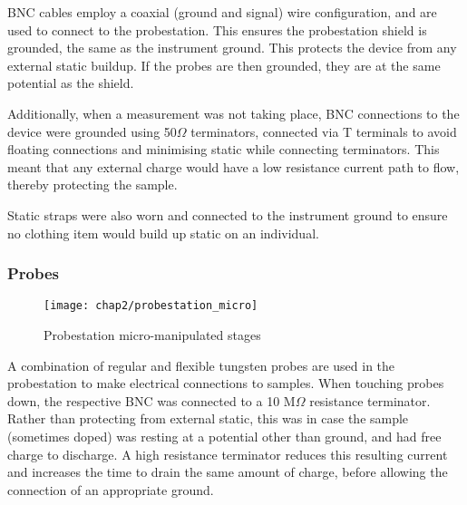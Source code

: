 \documentclass[../../Matt_Gebert_Honours_Thesis.tex]{subfiles}
\begin{document}
	BNC cables employ a coaxial (ground and signal) wire configuration, and are used to connect to the probestation. This ensures the probestation shield is grounded, the same as the instrument ground. This protects the device from any external static buildup. If the probes are then grounded, they are at the same potential as the shield.
	
	Additionally, when a measurement was not taking place, BNC connections to the device were grounded using 50$\Omega$ terminators, connected via T terminals to avoid floating connections and minimising static while connecting terminators. This meant that any external charge would have a low resistance current path to flow, thereby protecting the sample. 
	
	Static straps were also worn and connected to the instrument ground to ensure no clothing item would build up static on an individual.\newpage
	
	\subsubsection{Probes}
	\begin{wrapfigure}[12]{r}[0pt]{5.5cm}
		\vspace{-1cm}
		\centering
		\texttt{[image: chap2/probestation\_micro]}
		\caption{Probestation micro-manipulated stages}\label{fig:probestation_micro}
	\end{wrapfigure}
	A combination of regular and flexible tungsten probes are used in the probestation to make electrical connections to samples. 
	When touching probes down, the respective BNC was connected to a 10 M$\Omega$ resistance terminator. Rather than protecting from external static, this was in case the sample (sometimes doped) was resting at a potential other than ground, and had free charge to discharge. A high resistance terminator reduces this resulting current and increases the time to drain the same amount of charge, before allowing the connection of an appropriate ground.
	
\end{document}
